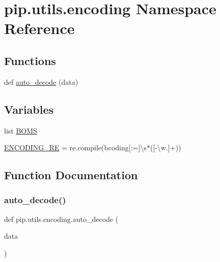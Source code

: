 \hypertarget{namespacepip_1_1utils_1_1encoding}{}\section{pip.\+utils.\+encoding Namespace Reference}
\label{namespacepip_1_1utils_1_1encoding}
\subsection*{Functions}
\begin{DoxyCompactItemize}
\item 
def \hyperlink{namespacepip_1_1utils_1_1encoding_a81f854dfd577fe8f004cddfc74d7e58b}{auto\+\_\+decode} (data)
\end{DoxyCompactItemize}
\subsection*{Variables}
\begin{DoxyCompactItemize}
\item 
list \hyperlink{namespacepip_1_1utils_1_1encoding_adb154be984065fe2c170a89d7dda7deb}{B\+O\+MS}
\item 
\hyperlink{namespacepip_1_1utils_1_1encoding_abb3bbfc7c97f461b48cff8119aea35a3}{E\+N\+C\+O\+D\+I\+N\+G\+\_\+\+RE} = re.\+compile(b\textquotesingle{}coding\mbox{[}\+:=\mbox{]}\textbackslash{}s$\ast$(\mbox{[}-\/\textbackslash{}w.\mbox{]}+)\textquotesingle{})
\end{DoxyCompactItemize}


\subsection{Function Documentation}
\mbox{\label{namespacepip_1_1utils_1_1encoding_a81f854dfd577fe8f004cddfc74d7e58b}} 
\subsubsection{\texorpdfstring{auto\+\_\+decode()}{auto\_decode()}}
{\footnotesize\ttfamily def pip.\+utils.\+encoding.\+auto\+\_\+decode (\begin{DoxyParamCaption}\item[{}]{data }\end{DoxyParamCaption})}


